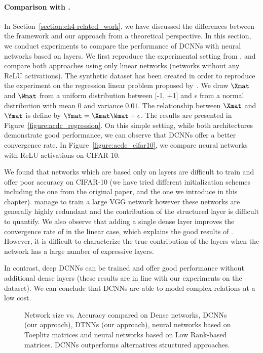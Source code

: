 \paragraph{Comparison with \ACDC \citep{moczulski2015acdc}.}

In Section~\ref{section:ch4-related_work}, we have discussed the differences between the \ACDC framework and our approach from a theoretical perspective.
In this section, we conduct experiments to compare the performance of DCNNs with neural networks based on \ACDC layers. 
We first reproduce the experimental setting from \citet{moczulski2015acdc}, and compare both approaches using only linear networks (\ie networks without any ReLU activations).
The synthetic dataset has been created in order to reproduce the experiment on the regression linear problem proposed by~\citet{moczulski2015acdc}.
We draw $\Xmat$ and $\Wmat$ from a uniform distribution between [-1, +1] and $\epsilon$ from a normal distribution with mean 0 and variance $0.01$.
The relationship between $\Xmat$ and $\Ymat$ is define by $\Ymat = \Xmat\Wmat + \epsilon$. 
The results are presented in Figure~\ref{figure:acdc_regression}.
On this simple setting, while both architectures demonstrate good performance, we can observe that DCNNs offer a better convergence rate.
In Figure~\ref{figure:acdc_cifar10}, we compare neural networks with ReLU activations on CIFAR-10. 

We found that networks which are based only on \ACDC layers are difficult to train and offer poor accuracy on CIFAR-10 (we have tried different initialization schemes including the one from the original paper, and the one we introduce in this chapter).
\citet{moczulski2015acdc} manage to train a large VGG network  however these networks are generally highly redundant and the contribution of the structured layer is difficult to quantify. 
We also observe that adding a single dense layer improves the convergence rate of \ACDC in the linear case, which explains the good results of \citet{moczulski2015acdc}.
However, it is difficult to characterize the true contribution of the \ACDC layers when the network has a large number of expressive layers.

In contrast, deep DCNNs can be trained and offer good performance without additional dense layers (these results are in line with our experiments on the \yt dataset).
We can conclude that DCNNs are able to model complex relations at a low cost. 

\begin{figure}
   \centering
   
   \caption{Network size vs. Accuracy compared on Dense networks, DCNNs (our approach), DTNNs (our approach), neural networks based on Toeplitz matrices and neural networks based on Low Rank-based matrices. DCNNs outperforms alternatives structured approaches.}
   \label{figure:cifar10_type}
\end{figure}

